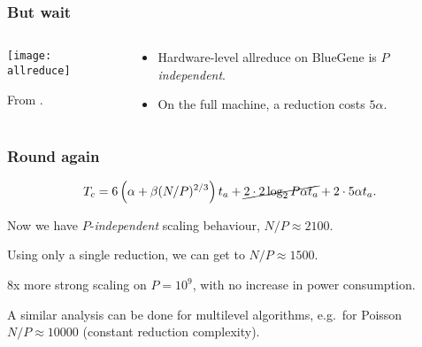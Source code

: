 \documentclass[presentation]{beamer}
\begin{document}
\begin{frame}
  \frametitle{But wait}
  \begin{columns}
    \begin{column}{0.6\textwidth}
      \texttt{[image: allreduce]}

      From \textcite{Fischer:2015}.
    \end{column}
    \begin{column}{0.4\textwidth}
      \begin{itemize}
      \item Hardware-level allreduce on BlueGene is \emph{$P$
          independent}.
      \item On the full machine, a reduction costs $5\alpha$.
      \end{itemize}
    \end{column}
  \end{columns}
\end{frame}

\begin{frame}
  \frametitle{Round again}
  \begin{equation*}
    T_c = 6 \left(\alpha + \beta (N/P)^{2/3}\right)t_a +
    \cancel{2\cdot 2 \log_2 P \alpha t_a} + 2 \cdot 5 \alpha t_a.
  \end{equation*}

  Now we have $P$-\emph{independent} scaling behaviour, $N/P \approx 2100$.

  Using only a single reduction, we can get to $N/P \approx
  1500$.

  \alert{8x} more strong scaling on $P=10^9$, with no increase in
  power consumption.

  A similar analysis can be done for multilevel algorithms,
  e.g.~for Poisson $N/P \approx 10000$ (constant reduction complexity).
\end{frame}
\end{document}
